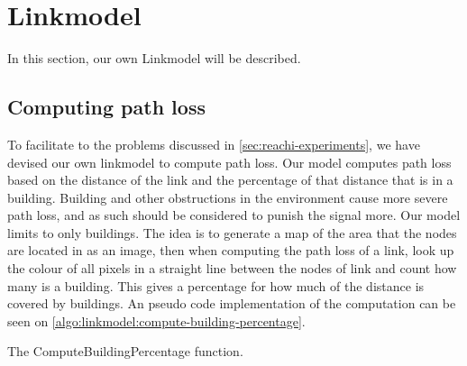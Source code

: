 \newpage
\section{Linkmodel}
In this section, our own Linkmodel will be described.




\subsection{Computing path loss}
To facilitate to the problems discussed in \autoref{sec:reachi-experiments}, we have devised our own linkmodel to compute path loss. Our model computes path loss based on the distance of the link and the percentage of that distance that is in a building. Building and other obstructions in the environment cause more severe path loss, and as such should be considered to punish the signal more. Our model limits to only buildings. The idea is to generate a map of the area that the nodes are located in as an image, then when computing the path loss of a link, look up the colour of all pixels in a straight line between the nodes  of link and count how many is a building. This gives a percentage for how much of the distance is covered by buildings. An pseudo code implementation of the computation can be seen on \autoref{algo:linkmodel:compute-building-percentage}.

\begin{algorithm}[H]
    \DontPrintSemicolon

    \caption{The ComputeBuildingPercentage function.}
    \label{algo:linkmodel:compute-building-percentage}
\end{algorithm}


